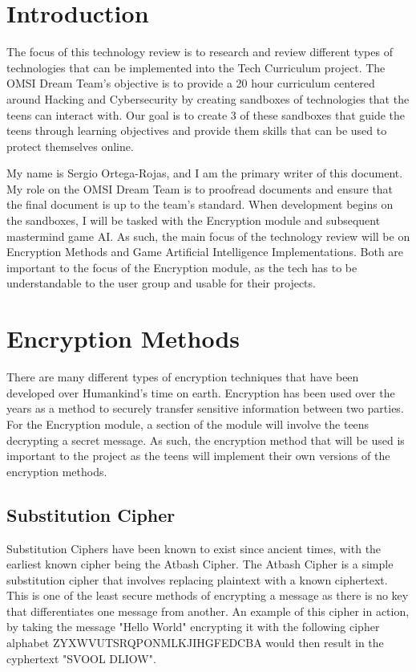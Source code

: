 \documentclass[onecolumn, draftclsnofoot,10pt, compsoc]{IEEEtran}
\begin{document}
\section{Introduction}
The focus of this technology review is to research and review different types of technologies that can be implemented into the Tech Curriculum project. The OMSI Dream Team's objective is to provide a 20 hour curriculum centered around Hacking and Cybersecurity by creating sandboxes of technologies that the teens can interact with. Our goal is to create 3 of these sandboxes that guide the teens through learning objectives and provide them skills that can be used to protect themselves online.

My name is Sergio Ortega-Rojas, and I am the primary writer of this document. My role on the OMSI Dream Team is to proofread documents and ensure that the final document is up to the team's standard. When development begins on the sandboxes, I will be tasked with the Encryption module and subsequent mastermind game AI. As such, the main focus of the technology review will be on Encryption Methods and Game Artificial Intelligence Implementations. Both are important to the focus of the Encryption module, as the tech has to be understandable to the user group and usable for their projects.

\section{Encryption Methods}
There are many different types of encryption techniques that have been developed over Humankind's time on earth. Encryption has been used over the years as a method to securely transfer sensitive information between two parties. For the Encryption module, a section of the module will involve the teens decrypting a secret message. As such, the encryption method that will be used is important to the project as the teens will implement their own versions of the encryption methods.
\subsection{Substitution Cipher}
Substitution Ciphers have been known to exist since ancient times, with the earliest known cipher being the Atbash Cipher. The Atbash Cipher is a simple substitution cipher that involves replacing plaintext with a known ciphertext. This is one of the least secure methods of encrypting a message as there is no key that differentiates one message from another. An example of this cipher in action, by taking the message "Hello World" encrypting it with the following cipher alphabet ZYXWVUTSRQPONMLKJIHGFEDCBA would then result in the cyphertext "SVOOL DLIOW".
\end{document}
